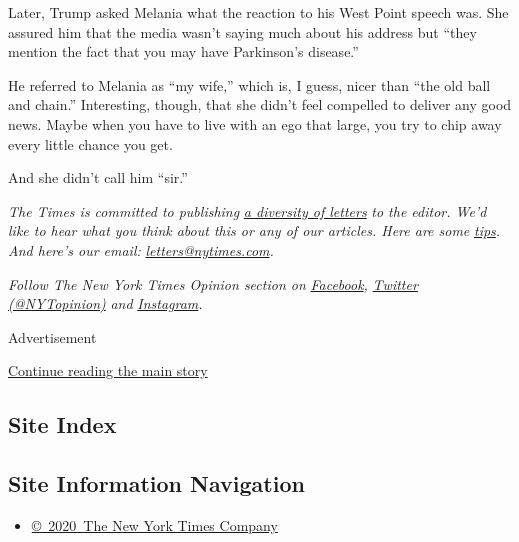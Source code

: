 Later, Trump asked Melania what the reaction to his West Point speech
was. She assured him that the media wasn't saying much about his address
but ``they mention the fact that you may have Parkinson's disease.''

He referred to Melania as ``my wife,'' which is, I guess, nicer than
``the old ball and chain.'' Interesting, though, that she didn't feel
compelled to deliver any good news. Maybe when you have to live with an
ego that large, you try to chip away every little chance you get.

And she didn't call him ``sir.''

\emph{The Times is committed to publishing}
\href{https://www.nytimes.com/2019/01/31/opinion/letters/letters-to-editor-new-york-times-women.html}{\emph{a
diversity of letters}} \emph{to the editor. We'd like to hear what you
think about this or any of our articles. Here are some}
\href{https://help.nytimes.com/hc/en-us/articles/115014925288-How-to-submit-a-letter-to-the-editor}{\emph{tips}}\emph{.
And here's our email:}
\href{mailto:letters@nytimes.com}{\emph{letters@nytimes.com}}\emph{.}

\emph{Follow The New York Times Opinion section on}
\href{https://www.facebook.com/nytopinion}{\emph{Facebook}}\emph{,}
\href{http://twitter.com/NYTOpinion}{\emph{Twitter (@NYTopinion)}}
\emph{and}
\href{https://www.instagram.com/nytopinion/}{\emph{Instagram}}\emph{.}

Advertisement

\protect\hyperlink{after-bottom}{Continue reading the main story}

\hypertarget{site-index}{%
\subsection{Site Index}\label{site-index}}

\hypertarget{site-information-navigation}{%
\subsection{Site Information
Navigation}\label{site-information-navigation}}

\begin{itemize}
\tightlist
\item
  \href{https://help.nytimes.com/hc/en-us/articles/115014792127-Copyright-notice}{©~2020~The
  New York Times Company}
\end{itemize}

